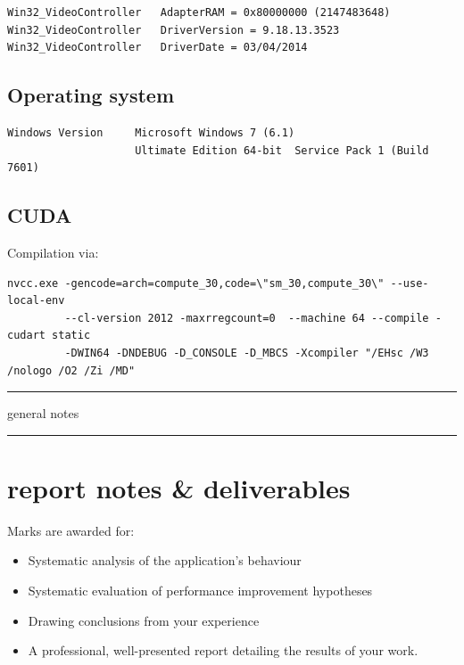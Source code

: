 \documentclass[11pt, oneside, a4paper]{article}
\begin{document}
\begin{appendices}
\begin{verbatim}
Win32_VideoController   AdapterRAM = 0x80000000 (2147483648)
Win32_VideoController   DriverVersion = 9.18.13.3523
Win32_VideoController   DriverDate = 03/04/2014
\end{verbatim}

\subsection{Operating system} %
\label{sub:operating_system}
\begin{verbatim}
Windows Version     Microsoft Windows 7 (6.1)
                    Ultimate Edition 64-bit  Service Pack 1 (Build 7601) 
\end{verbatim}

\subsection{CUDA} %
\label{sub:cuda}
Compilation via:
\begin{verbatim}
nvcc.exe -gencode=arch=compute_30,code=\"sm_30,compute_30\" --use-local-env 
         --cl-version 2012 -maxrregcount=0  --machine 64 --compile -cudart static 
         -DWIN64 -DNDEBUG -D_CONSOLE -D_MBCS -Xcompiler "/EHsc /W3 /nologo /O2 /Zi /MD"
\end{verbatim}

\end{appendices}


\hspace{1em}
\hrule
general notes
\hspace{1em}
\hrule

\section{report notes \& deliverables} %
\label{sec:report_notes_on_deliverables}

Marks are awarded for:
\begin{itemize}
\item  Systematic analysis of the application's behaviour
\item  Systematic evaluation of performance improvement hypotheses
\item  Drawing conclusions from your experience
\item  A professional, well-presented report detailing the results of your work.
\end{itemize}
\end{document}
